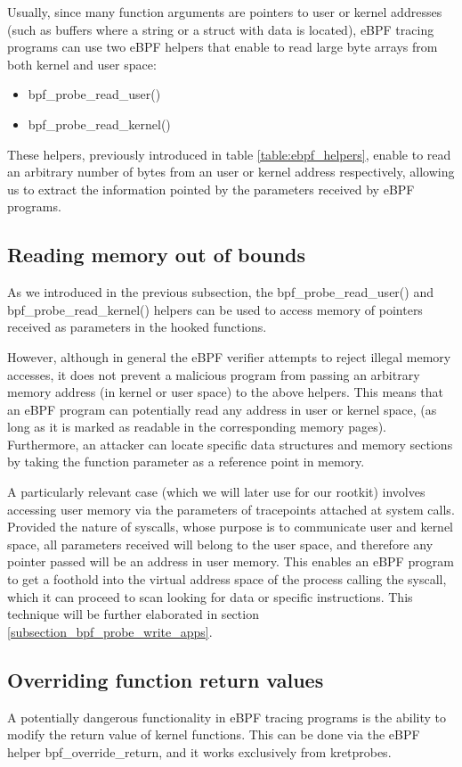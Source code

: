 Usually, since many function arguments are pointers to user or kernel addresses (such as buffers where a string or a struct with data is located), eBPF tracing programs can use two eBPF helpers that enable to read large byte arrays from both kernel and user space:
\begin{itemize}
\item bpf\_probe\_read\_user()
\item bpf\_probe\_read\_kernel()
\end{itemize}

These helpers, previously introduced in table \ref{table:ebpf_helpers}, enable to read an arbitrary number of bytes from an user or kernel address respectively, allowing us to extract the information pointed by the parameters received by eBPF programs.

\subsection{Reading memory out of bounds} \label{subsection:out_read_bounds}
As we introduced in the previous subsection, the bpf\_probe\_read\_user() and bpf\_probe\_read\_kernel() helpers can be used to access memory of pointers received as parameters in the hooked functions. 

However, although in general the eBPF verifier attempts to reject illegal memory accesses, it does not prevent a malicious program from passing an arbitrary memory address (in kernel or user space) to the above helpers. This means that an eBPF program can potentially read any address in user or kernel space, (as long as it is marked as readable in the corresponding memory pages). Furthermore, an attacker can locate specific data structures and memory sections by taking the function parameter as a reference point in memory.

A particularly relevant case (which we will later use for our rootkit) involves accessing user memory via the parameters of tracepoints attached at system calls. Provided the nature of syscalls, whose purpose is to communicate user and kernel space, all parameters received will belong to the user space, and therefore any pointer passed will be an address in user memory. This enables an eBPF program to get a foothold into the virtual address space of the process calling the syscall, which it can proceed to scan looking for data or specific instructions. This technique will be further elaborated in section \ref{subsection_bpf_probe_write_apps}.

\subsection{Overriding function return values}
A potentially dangerous functionality in eBPF tracing programs is the ability to modify the return value of kernel functions\cite{ebpf_friends_p15}\cite{ebpf_override_return}. This can be done via the eBPF helper bpf\_override\_return, and it works exclusively from kretprobes.

